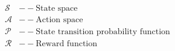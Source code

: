 \documentclass[preview]{standalone}
\begin{document}
\begin{align*}
\mathcal{S} &-- \text{State space} \\
            \mathcal{A} &-- \text{Action space} \\
            \mathcal{P} &-- \text{State transition probability function} \\
            \mathcal{R} &-- \text{Reward function} \\
\end{align*}
\end{document}
